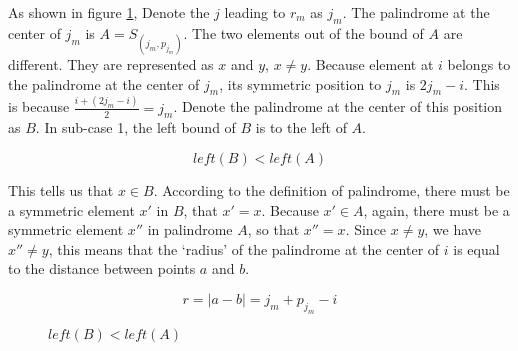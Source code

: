 \documentclass[b5paper]{article}
\begin{document}
As shown in figure \cref{fig:subcase1}, Denote the $j$ leading to $r_m$ as $j_m$. The palindrome at the
center of $j_m$ is $A = S_{(j_m, p_{j_m})}$. The two elements out of the bound of $A$ are different.
They are represented as $x$ and $y$, $x \neq y$. Because element at $i$ belongs to the palindrome
at the center of $j_m$, its symmetric position to $j_m$ is $2j_m - i$. This is because
$\frac{i + (2j_m -i)}{2} = j_m$. Denote the palindrome at the center of this position as $B$.
In sub-case 1, the left bound of $B$ is to the left of $A$.

\[
left(B) < left(A)
\]

This tells us that $x \in B$. According to the definition of palindrome, there must be a symmetric
element $x'$ in $B$, that $x' = x$. Because $x' \in A$, again, there must be a symmetric element
$x''$ in palindrome $A$, so that $x'' = x$. Since $x \neq y$, we have $x'' \neq y$, this means that
the `radius' of the palindrome at the center of $i$ is equal to the distance between points $a$ and $b$.

\[
r = |a - b| = j_m + p_{j_m} - i
\]


\begin{figure}[htbp]
\centering
{}
\caption{$left(B) < left(A)$}
\label{fig:subcase1}
\end{figure}
\end{document}
